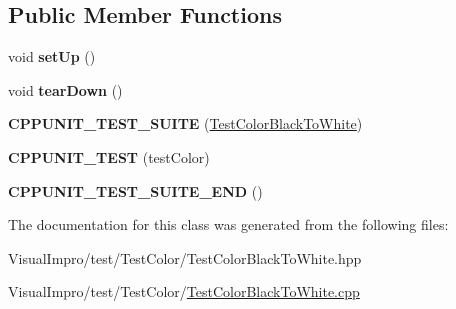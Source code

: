 \subsection*{Public Member Functions}
\begin{DoxyCompactItemize}
\item 
\mbox{\label{class_test_color_black_to_white_a1de8ecf4012dbc587ea6daa0445c7146}} 
void {\bfseries set\+Up} ()
\item 
\mbox{\label{class_test_color_black_to_white_ad4c9c5416242da34f8d5c6a0b41dc03e}} 
void {\bfseries tear\+Down} ()
\item 
\mbox{\label{class_test_color_black_to_white_aab42d7d2adb0970295167adc46a928a0}} 
{\bfseries C\+P\+P\+U\+N\+I\+T\+\_\+\+T\+E\+S\+T\+\_\+\+S\+U\+I\+TE} (\mbox{\hyperlink{class_test_color_black_to_white}{Test\+Color\+Black\+To\+White}})
\item 
\mbox{\label{class_test_color_black_to_white_ab7fc1574d24db9e50607932074cbd8a1}} 
{\bfseries C\+P\+P\+U\+N\+I\+T\+\_\+\+T\+E\+ST} (test\+Color)
\item 
\mbox{\label{class_test_color_black_to_white_aa35a8e69d11dc3f71533f11242e5fc8e}} 
{\bfseries C\+P\+P\+U\+N\+I\+T\+\_\+\+T\+E\+S\+T\+\_\+\+S\+U\+I\+T\+E\+\_\+\+E\+ND} ()
\end{DoxyCompactItemize}


The documentation for this class was generated from the following files\+:\begin{DoxyCompactItemize}
\item 
Visual\+Impro/test/\+Test\+Color/Test\+Color\+Black\+To\+White.\+hpp\item 
Visual\+Impro/test/\+Test\+Color/\mbox{\hyperlink{_test_color_black_to_white_8cpp}{Test\+Color\+Black\+To\+White.\+cpp}}\end{DoxyCompactItemize}
